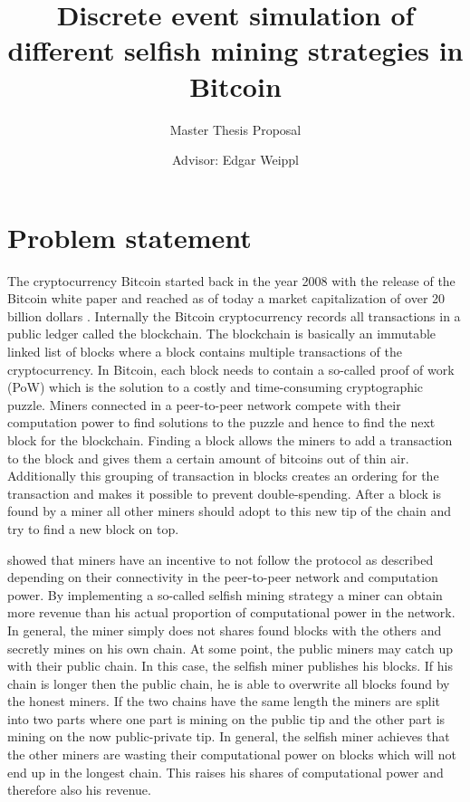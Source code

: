 \documentclass{scrartcl}
\title{Discrete event simulation of different selfish mining strategies in Bitcoin}
\subtitle{Master Thesis Proposal}
\author{Advisor: Edgar Weippl}
\begin{document}
\maketitle

\section{Problem statement}
The cryptocurrency Bitcoin started back in the year 2008 with the release of the Bitcoin white paper \cite{nakamoto2008bitcoin} and reached as of today a market capitalization of over 20 billion dollars \cite{MarketCap2017,Coindesk2017}. Internally the Bitcoin cryptocurrency records all transactions in a public ledger called the blockchain. The blockchain is basically an immutable linked list of blocks where a block contains multiple transactions of the cryptocurrency. In Bitcoin, each block needs to contain a so-called proof of work (PoW) which is the solution to a costly and time-consuming cryptographic puzzle. Miners connected in a peer-to-peer network compete with their computation power to find solutions to the puzzle and hence to find the next block for the blockchain. Finding a block allows the miners to add a transaction to the block and gives them a certain amount of bitcoins out of thin air. Additionally this grouping of transaction in blocks creates an ordering for the transaction and makes it possible to prevent double-spending. After a block is found by a miner all other miners should adopt to this new tip of the chain and try to find a new block on top.

\citeauthor{eyal2014majority} showed that miners have an incentive to not follow the protocol as described depending on their connectivity in the peer-to-peer network and computation power. By implementing a so-called selfish mining strategy a miner can obtain more revenue than his actual proportion of computational power in the network. In general, the miner simply does not shares found blocks with the others and secretly mines on his own chain. At some point, the public miners may catch up with their public chain. In this case, the selfish miner publishes his blocks. If his chain is longer then the public chain, he is able to overwrite all blocks found by the honest miners. If the two chains have the same length the miners are split into two parts where one part is mining on the public tip and the other part is mining on the now public-private tip. In general, the selfish miner achieves that the other miners are wasting their computational power on blocks which will not end up in the longest chain. This raises his shares of computational power and therefore also his revenue.
\end{document}

